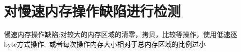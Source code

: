 \hypertarget{index_SlowMemoryChecker}{}\section{对慢速内存操作缺陷进行检测}\label{index_SlowMemoryChecker}
慢速内存操作缺陷\+:对较大的内存区域的清零，拷贝，比较等操作，使用低速逐byte方式操作, 或者每次操作内存大小相对于总内存区域的比例过小 